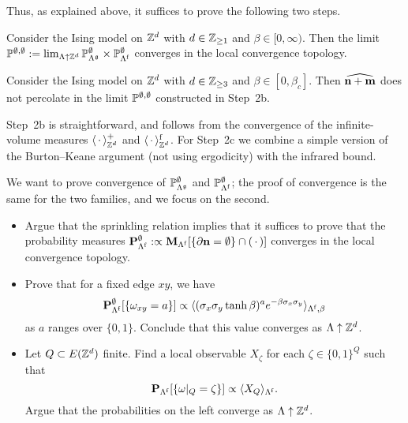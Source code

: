 Thus, as explained above, it suffices to prove the following two steps.

\begin{lemma}\label{lemma:continuity_step2b}
    Consider the Ising model on $\Z^d$ with $d\in\Z_{\geq 1}$
    and $\beta\in[0,\infty)$.
    Then the limit $\P^{\emptyset,\emptyset}:=
        \lim_{\Lambda\uparrow\Z^d}
        \P_{\Lambda^\frakg}^\emptyset\times\P_{\Lambda^\f}^\emptyset
        $ converges in the local convergence topology.
\end{lemma}

\begin{lemma}\label{lemma:continuity_step2c}
    Consider the Ising model on $\Z^d$ with $d\in\Z_{\geq 3}$
    and $\beta\in[0,\beta_c]$.
    Then $\widehat{\n+\m}$ does not percolate in the limit $\P^{\emptyset,\emptyset}$ constructed
    in Step~2b.
\end{lemma}

Step~2b is straightforward, and follows
from the convergence of the infinite-volume measures $\langle\blank\rangle^+_{\Z^d}$
and $\langle\blank\rangle^\f_{\Z^d}$.
For Step~2c we combine a simple version of the Burton--Keane argument
(not using ergodicity)
with the infrared bound.

\begin{exercise}
    We want to prove convergence
    of $\P_{\Lambda^\frakg}^\emptyset$ and $\P_{\Lambda^\f}^\emptyset$;
    the proof of convergence is the same for the two families,
    and we focus on the second.
    \begin{itemize}
        \item Argue that the sprinkling relation implies that it suffices to prove that the probability measures
        $\bfP_{\Lambda^\f}^\emptyset:\propto\bfM_{\Lambda^\f}[\{\partial\n=\emptyset\}\cap(\blank)]$
        converges in the local convergence topology.
        \item Prove that for a fixed edge $xy$,
        we have 
        \[
            \bfP_{\Lambda^\f}^\emptyset[\{\omega_{xy}=a\}]\propto 
            \langle
            (\sigma_x\sigma_y\tanh\beta)^a e^{-\beta\sigma_x\sigma_y}
            \rangle_{\Lambda^\f,\beta}
        \]
        as $a$ ranges over $\{0,1\}$.
        Conclude that this value converges as $\Lambda\uparrow\Z^d$.
        \item Let $Q\subset E(\Z^d)$ finite.
        Find a local observable $X_\zeta$ for each $\zeta\in\{0,1\}^Q$ such that
        \[
            \bfP_{\Lambda^\f}[\{\omega|_Q=\zeta\}]\propto \langle X_Q\rangle_{\Lambda^\f}.
        \]
        Argue that the probabilities on the left converge as $\Lambda\uparrow\Z^d$.
    \end{itemize}
\end{exercise}


